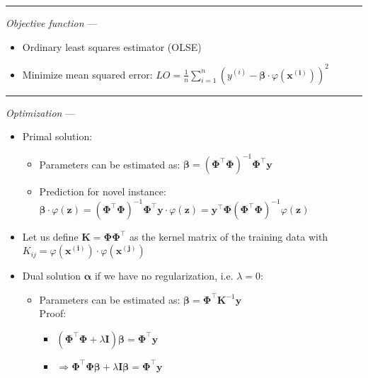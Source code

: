 {\color{lightgray}\hrule height 0.001mm}

\emph{Objective function} --- 
\begin{itemize}
    \item Ordinary least squares estimator (OLSE)
    \item Minimize mean squared error: $LO = \frac{1}{n} \sum_{i=1}^n ( y^{(i)} - \boldsymbol{\beta} \cdot \varphi(\boldsymbol{x^{(i)}} ))^2$
\end{itemize}

{\color{lightgray}\hrule height 0.001mm}

\emph{Optimization} ---
\begin{itemize}
    \item Primal solution:
    \begin{itemize}
        \item Parameters can be estimated as: $\boldsymbol{\beta} = (\boldsymbol{\Phi}^\intercal \boldsymbol{\Phi})^{-1}  \boldsymbol{\Phi}^\intercal \boldsymbol{y}$
        \item Prediction for novel instance: $\boldsymbol{\beta} \cdot \varphi({\boldsymbol{z}}) = (\boldsymbol{\Phi}^\intercal \boldsymbol{\Phi})^{-1}  \boldsymbol{\Phi}^\intercal \boldsymbol{y} \cdot \varphi({\boldsymbol{z}}) = \boldsymbol{y}^\intercal \boldsymbol{\Phi} (\boldsymbol{\Phi}^\intercal \boldsymbol{\Phi})^{-1} \varphi({\boldsymbol{z}}) $
    \end{itemize}
    \item Let us define $\boldsymbol{K} = \boldsymbol{\Phi} \boldsymbol{\Phi}^\intercal$ as the kernel matrix of the training data with $K_{ij} = \varphi(\boldsymbol{x^{(i)}}) \cdot \varphi(\boldsymbol{x^{(j)}})$
    \item Dual solution $\boldsymbol{\alpha}$ if we have no regularization, i.e. $\lambda = 0$:
    \begin{itemize}
        \item Parameters can be estimated as: $\boldsymbol{\beta} =  \boldsymbol{\Phi}^\intercal \boldsymbol{K}^{-1} \boldsymbol{y}$\\
        Proof:
        \begin{itemize}
            \item $(\boldsymbol{\Phi}^\intercal \boldsymbol{\Phi} + \lambda \boldsymbol{I}) \boldsymbol{\beta} = \boldsymbol{\Phi}^\intercal \boldsymbol{y}$
            \item $\Rightarrow \boldsymbol{\Phi}^\intercal \boldsymbol{\Phi} \boldsymbol{\beta} + \lambda \boldsymbol{I} \boldsymbol{\beta} = \boldsymbol{\Phi}^\intercal \boldsymbol{y}$

\end{itemize}
\end{itemize}
\end{itemize}
